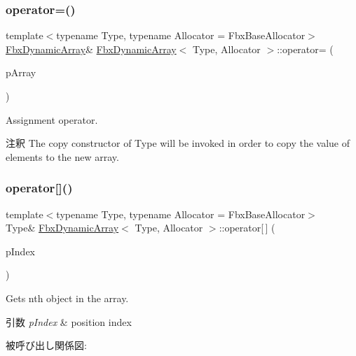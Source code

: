 \subsubsection{\texorpdfstring{operator=()}{operator=()}}
{\footnotesize\ttfamily template$<$typename Type, typename Allocator = Fbx\+Base\+Allocator$>$ \\
\hyperlink{class_fbx_dynamic_array}{Fbx\+Dynamic\+Array}\& \hyperlink{class_fbx_dynamic_array}{Fbx\+Dynamic\+Array}$<$ Type, Allocator $>$\+::operator= (\begin{DoxyParamCaption}\item[{const \hyperlink{class_fbx_dynamic_array}{Fbx\+Dynamic\+Array}$<$ Type, Allocator $>$ \&}]{p\+Array }\end{DoxyParamCaption})}

Assignment operator. \begin{DoxyRemark}{注釈}
The copy constructor of {\ttfamily Type} will be invoked in order to copy the value of elements to the new array. 
\end{DoxyRemark}
\mbox{\label{class_fbx_dynamic_array_a94ce9d01d2bd94e209b0b5bb02d8cd49}} 
\subsubsection{\texorpdfstring{operator[]()}{operator[]()}\hspace{0.1cm}{\footnotesize\ttfamily [1/2]}}
{\footnotesize\ttfamily template$<$typename Type, typename Allocator = Fbx\+Base\+Allocator$>$ \\
Type\& \hyperlink{class_fbx_dynamic_array}{Fbx\+Dynamic\+Array}$<$ Type, Allocator $>$\+::operator\mbox{[}$\,$\mbox{]} (\begin{DoxyParamCaption}\item[{const size\+\_\+t}]{p\+Index }\end{DoxyParamCaption})}

Gets nth object in the array. 
\begin{DoxyParams}{引数}
{\em p\+Index} & position index \\
\hline
\end{DoxyParams}
被呼び出し関係図\+:
\mbox{\label{class_fbx_dynamic_array_ada7506435417b4811a85f85706e9ecb9}} 

